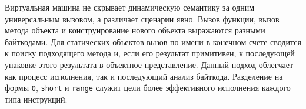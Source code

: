 Виртуальная машина не скрывает динамическую
семантику за одним универсальным вызовом, а различает сценарии явно. Вызов функции,
вызов метода объекта и конструирование нового объекта выражаются разными байткодами. Для
статических объектов вызов по имени в конечном счете сводится к поиску подходящего метода и,
если его результат примитивен, к последующей упаковке этого результата в объектное представление.
Данный подход облегчает как процесс исполнения, так и последующий анализ байткода.
Разделение на формы \texttt{0}, \texttt{short} и \texttt{range} служит цели более эффективного 
исполнения каждого типа инструкций.
